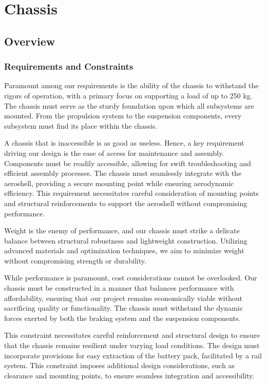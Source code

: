 
\section{Chassis}




\subsection{Overview}


\subsubsection{Requirements and Constraints}

Paramount among our requirements is the ability of the chassis to withstand the rigors of operation, with a primary focus on supporting a load of up to 250 kg. The chassis must serve as the sturdy foundation upon which all subsystems are mounted. From the propulsion system to the suspension components, every subsystem must find its place within the chassis. 

A chassis that is inaccessible is as good as useless. Hence, a key requirement driving our design is the ease of access for maintenance and assembly. Components must be readily accessible, allowing for swift troubleshooting and efficient assembly processes. The chassis must seamlessly integrate with the aeroshell, providing a secure mounting point while ensuring aerodynamic efficiency. This requirement necessitates careful consideration of mounting points and structural reinforcements to support the aeroshell without compromising performance. 

Weight is the enemy of performance, and our chassis must strike a delicate balance between structural robustness and lightweight construction. Utilizing advanced materials and optimization techniques, we aim to minimize weight without compromising strength or durability. 

While performance is paramount, cost considerations cannot be overlooked. Our chassis must be constructed in a manner that balances performance with affordability, ensuring that our project remains economically viable without sacrificing quality or functionality. The chassis must withstand the dynamic forces exerted by both the braking system and the suspension components. 

This constraint necessitates careful reinforcement and structural design to ensure that the chassis remains resilient under varying load conditions. The design must incorporate provisions for easy extraction of the battery pack, facilitated by a rail system. This constraint imposes additional design considerations, such as clearance and mounting points, to ensure seamless integration and accessibility.


